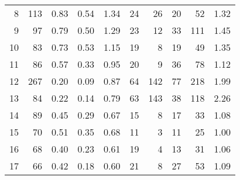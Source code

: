 \begin{tabular}{rrrrrrrrrr}
 8 &      113 &                             0.83 &                             0.54 &                             1.34 &              24 &              26 &                                 20 &                              52 &       1.32 \\
 9 &       97 &                             0.79 &                             0.50 &                             1.29 &              23 &              12 &                                 33 &                             111 &       1.45 \\
10 &       83 &                             0.73 &                             0.53 &                             1.15 &              19 &               8 &                                 19 &                              49 &       1.35 \\
11 &       86 &                             0.57 &                             0.33 &                             0.95 &              20 &               9 &                                 36 &                              78 &       1.12 \\
12 &      267 &                             0.20 &                             0.09 &                             0.87 &              64 &             142 &                                 77 &                             218 &       1.99 \\
13 &       84 &                             0.22 &                             0.14 &                             0.79 &              63 &             143 &                                 38 &                             118 &       2.26 \\
14 &       89 &                             0.45 &                             0.29 &                             0.67 &              15 &               8 &                                 17 &                              33 &       1.08 \\
15 &       70 &                             0.51 &                             0.35 &                             0.68 &              11 &               3 &                                 11 &                              25 &       1.00 \\
16 &       68 &                             0.40 &                             0.23 &                             0.61 &              19 &               4 &                                 13 &                              31 &       1.06 \\
17 &       66 &                             0.42 &                             0.18 &                             0.60 &              21 &               8 &                                 27 &                              53 &       1.09 \\

\end{tabular}
